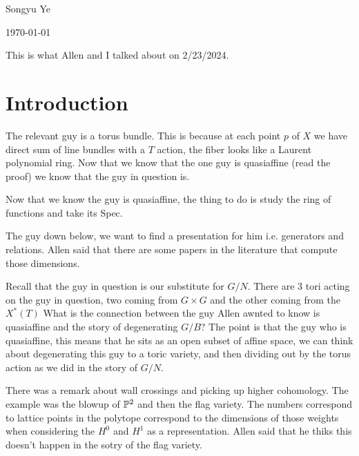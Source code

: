 \documentclass[12pt]{article}
\begin{document}
Songyu Ye

\today

\hfill

This is what Allen and I talked about on 2/23/2024.

\section{Introduction}

The relevant guy is a torus bundle. This is because at each point $p$ of $X$ we have direct sum of line bundles with a $T$ action, the fiber looks like
a Laurent polynomial ring.
Now that we know that the one guy is quasiaffine (read the proof) 
we know that the guy in question is. 

\hfill

Now that we know the guy is quasiaffine, the thing to do is study the ring of functions and take its Spec.

\hfill

The guy down below, we want to find a presentation for him i.e. generators and relations. Allen said that there are some papers in the literature that compute those dimensions.

\hfill

Recall that the guy in question is our substitute for $G/N$. There are 3 tori acting on the guy in question, two coming from $G\times G$ and the other coming from the $X^*(T)$
What is the connection between the guy Allen awnted to know is quasiaffine and the story of degenerating $G/B$? The point is that the guy who is quasiaffine, this means that he sits
as an open subset of affine space, we can think about degenerating this guy to a toric variety, and then dividing out by the torus action as we did in the story of $G/N$.

\hfill

There was a remark about wall crossings and picking up higher cohomology. The example was the blowup of $\P^2$ and then the flag variety. The numbers correspond to lattice points in 
the polytope correspond to the dimensions of those weights when considering the $H^0$ and $H^1$ as a representation.
Allen said that he thiks this doesn't happen in the sotry of the flag variety.
\end{document}
